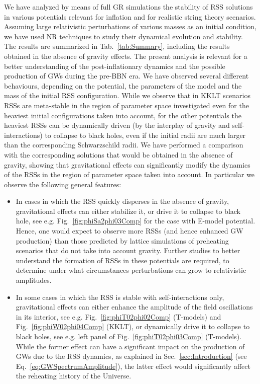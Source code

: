 \documentclass[11pt,a4paper]{article}
\begin{document}
We have analyzed by means of full GR simulations the stability of RSS solutions in various potentials relevant for inflation and for realistic string theory scenarios. Assuming large relativistic perturbations of various masses as an initial condition, we have used NR techniques to study their dynamical evolution and stability. The results are summarized in Tab.~\ref{tab:Summary}, including the results obtained in the absence of gravity effects. The present analysis is relevant for a better understanding of the post-inflationary dynamics and the possible production of GWs during the pre-BBN era. We have observed several different behaviours, depending on the potential, the parameters of the model and the mass of the initial RSS configuration. While we observe that in KKLT scenarios RSSs are meta-stable in the region of parameter space investigated even for the heaviest initial configurations taken into account, for the other potentials the heaviest RSSs can be dynamically driven (by the interplay of gravity and self-interactions) to collapse to black holes, even if the initial radii are much larger than the corresponding Schwarzschild radii. We have performed a comparison with the corresponding solutions that would be obtained in the absence of gravity, showing that gravitational effects can significantly modify the dynamics of the RSSs in the region of parameter space taken into account. In particular we observe the following general features:
\begin{itemize}
\item In cases in which the RSS quickly disperses in the absence of gravity, gravitational effects can either stabilize it, or drive it to collapse to black hole, see e.g. Fig.~\ref{fig:phiSa2phi03Comp} for the case with E-model potential. Hence, one would expect to observe more RSSs (and hence enhanced GW production) than those predicted by lattice simulations of preheating scenarios that do not take into account gravity. Further studies to better understand  the formation of RSSs in these potentials are required, to determine under what circumstances perturbations can grow to relativistic amplitudes.
\item In some cases in which the RSS is stable with self-interactions only, gravitational effects can either enhance the amplitude of the field oscillations in its interior, see e.g. Fig.~\ref{fig:phiT02phi02Comp} (T-models) and Fig.~\ref{fig:phiW02phi04Comp} (KKLT), or dynamically drive it to collapse to black holes, see e.g. left panel of Fig.~\ref{fig:phiT02phi03Comp} (T-models). While the former effect can have a significant impact on the production of GWs due to the RSS dynamics, as explained in Sec.~\ref{sec:Introduction} (see Eq.~\eqref{eq:GWSpectrumAmplitude}), the latter effect would significantly affect the reheating history of the Universe.
\end{itemize}
\end{document}
